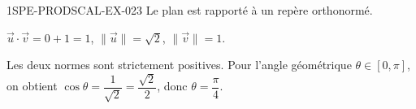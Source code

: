 \begin{corrige}{1SPE-PRODSCAL-EX-023}
Le plan est rapporté à un repère orthonormé.

$\vec{u} \cdot \vec{v} = 0 + 1 = 1$, $\|\vec{u}\| = \sqrt{2}$, $\|\vec{v}\| = 1$.

Les deux normes sont strictement positives. Pour l'angle géométrique $\theta\in[0,\pi]$, on obtient $\cos\theta = \dfrac{1}{\sqrt{2}} = \dfrac{\sqrt{2}}{2}$, donc $\theta = \dfrac{\pi}{4}$.
\end{corrige}
